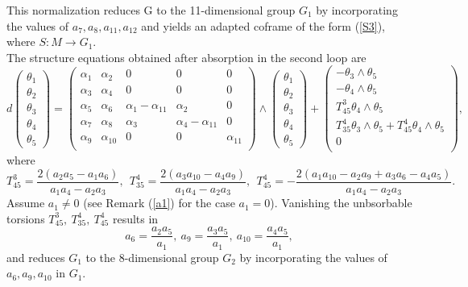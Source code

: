 \documentclass[12pt]{article}
\begin{document}
This normalization reduces G to the 11-dimensional group $G_1$ by incorporating the values of $a_7,a_8,a_{11},a_{12}$ and yields an adapted coframe of the form (\ref{S3}), where $S:M\rightarrow G_1$.\\

The structure equations obtained after absorption in the second loop are
\begin{equation}
d\begin{pmatrix}
\theta_1\\
\theta_2\\
\theta_3\\
\theta_4\\
\theta_5
\end{pmatrix}
=\begin{pmatrix}
\alpha_1&\alpha_2&0&0&0\\
\alpha_3&\alpha_4&0&0&0\\
\alpha_5&\alpha_6&\alpha_1-\alpha_{11}&\alpha_2&0\\
\alpha_7&\alpha_{8}&\alpha_{3}&\alpha_{4}-\alpha_{11}&0\\
\alpha_{9}&\alpha_{10}&0&0&\alpha_{11}\\
\end{pmatrix}\wedge
\begin{pmatrix}
\theta_1\\
\theta_2\\
\theta_3\\
\theta_4\\
\theta_5
\end{pmatrix}+\begin{pmatrix}
-\theta_3\wedge\theta_5\\
-\theta_4\wedge\theta_5\\
T^3_{45}\theta_4\wedge\theta_5\\
T^4_{35}\theta_3\wedge\theta_5+T^4_{45}\theta_4\wedge\theta_5\\
0\\
\end{pmatrix},
\end{equation}
where 
\begin{equation}
T^3_{45}=\frac{2(a_2a_5-a_1a_6)}{a_1a_4-a_2a_3},~~T^4_{35}=\frac{2(a_3a_{10}-a_4a_9)}{a_1a_4-a_2a_3},~~T^4_{45}=-\frac{2(a_1a_{10}-a_2a_9+a_3a_6-a_4a_5)}{a_1a_4-a_2a_3}.
\end{equation}
Assume $a_1\neq0$ (see Remark (\ref{a1}) for the case $a_1= 0$). Vanishing the unbsorbable torsions $T^3_{45}, ~T^4_{35},~ T^4_{45}$  results in
\begin{equation}
a_6=\frac{a_2a_5}{a_1},~a_9=\frac{a_3a_5}{a_1},~a_{10}=\frac{a_4a_5}{a_1},
\end{equation}
and reduces $G_1$ to the 8-dimensional group $G_2$ by incorporating the values of $a_6, a_9, a_{10}$ in $G_1$.\\
\end{document}
